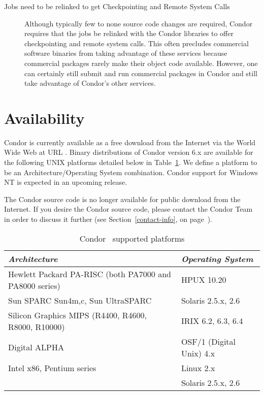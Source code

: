 \begin{description}
	\item[Jobs need to be relinked to get Checkpointing and Remote System Calls] Although 
typically few to none source code changes are required,
Condor requires
that the jobs be relinked with the Condor libraries to offer checkpointing and
remote system calls. This often
precludes commercial software binaries from taking advantage of these services
 because commercial packages rarely make their object code
available. However, one can certainly still submit and run commercial packages in Condor 
and still take advantage of Condor's other services.

\end{description}

\section{Availability}
Condor is currently available as a free download from the Internet via the World Wide Web at  
URL .
Binary distributions of Condor version 6.x are available for the following UNIX platforms 
detailed below in Table~\ref{supported-platforms}.  We define a platform to be an 
Architecture/Operating System combination.  Condor support for Windows NT is 
expected in an upcoming release.  

The Condor source code is no longer available for public download from the Internet.  If you 
desire the Condor source code, please contact the Condor Team in order to discuss it further 
(see Section~\ref{contact-info}, on page~\pageref{contact-info}).

\begin{center}
\begin{table}
\begin{tabular}{|ll|} \hline
\emph{Architecture} & \emph{Operating System} \\ \hline \hline
Hewlett Packard PA-RISC (both PA7000 and PA8000 series) & HPUX 10.20 \\ \hline
Sun SPARC Sun4{m,c}, Sun UltraSPARC & Solaris 2.5.x, 2.6 \\ \hline
Silicon Graphics MIPS (R4400, R4600, R8000, R10000) & IRIX 6.2, 6.3, 6.4 \\ \hline
Digital ALPHA & OSF/1 (Digital Unix) 4.x \\ \hline
Intel x86, Pentium series & Linux 2.x \\
 & Solaris 2.5.x, 2.6 \\ \hline
\end{tabular}
\caption{\label{supported-platforms}Condor \VersionNotice\ supported platforms}
\end{table}
\end{center}

